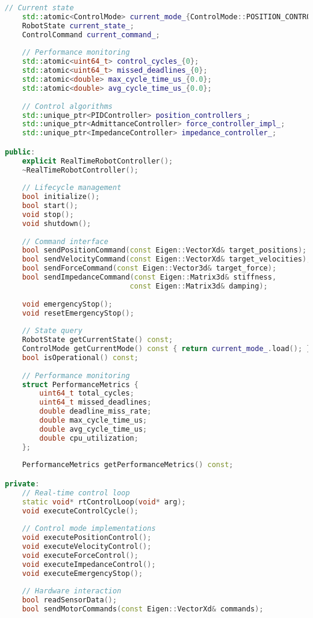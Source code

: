 \begin{lstlisting}[language=C++, caption={Real-Time Robot Controller}, label={lst:app-realtime-controller}]
    // Current state
    std::atomic<ControlMode> current_mode_{ControlMode::POSITION_CONTROL};
    RobotState current_state_;
    ControlCommand current_command_;
    
    // Performance monitoring
    std::atomic<uint64_t> control_cycles_{0};
    std::atomic<uint64_t> missed_deadlines_{0};
    std::atomic<double> max_cycle_time_us_{0.0};
    std::atomic<double> avg_cycle_time_us_{0.0};
    
    // Control algorithms
    std::unique_ptr<PIDController> position_controllers_;
    std::unique_ptr<AdmittanceController> force_controller_impl_;
    std::unique_ptr<ImpedanceController> impedance_controller_;

public:
    explicit RealTimeRobotController();
    ~RealTimeRobotController();
    
    // Lifecycle management
    bool initialize();
    bool start();
    void stop();
    void shutdown();
    
    // Command interface
    bool sendPositionCommand(const Eigen::VectorXd& target_positions);
    bool sendVelocityCommand(const Eigen::VectorXd& target_velocities);
    bool sendForceCommand(const Eigen::Vector3d& target_force);
    bool sendImpedanceCommand(const Eigen::Matrix3d& stiffness, 
                             const Eigen::Matrix3d& damping);
    
    void emergencyStop();
    void resetEmergencyStop();
    
    // State query
    RobotState getCurrentState() const;
    ControlMode getCurrentMode() const { return current_mode_.load(); }
    bool isOperational() const;
    
    // Performance monitoring
    struct PerformanceMetrics {
        uint64_t total_cycles;
        uint64_t missed_deadlines;
        double deadline_miss_rate;
        double max_cycle_time_us;
        double avg_cycle_time_us;
        double cpu_utilization;
    };
    
    PerformanceMetrics getPerformanceMetrics() const;

private:
    // Real-time control loop
    static void* rtControlLoop(void* arg);
    void executeControlCycle();
    
    // Control mode implementations
    void executePositionControl();
    void executeVelocityControl();
    void executeForceControl();
    void executeImpedanceControl();
    void executeEmergencyStop();
    
    // Hardware interaction
    bool readSensorData();
    bool sendMotorCommands(const Eigen::VectorXd& commands);
    

\end{lstlisting}
